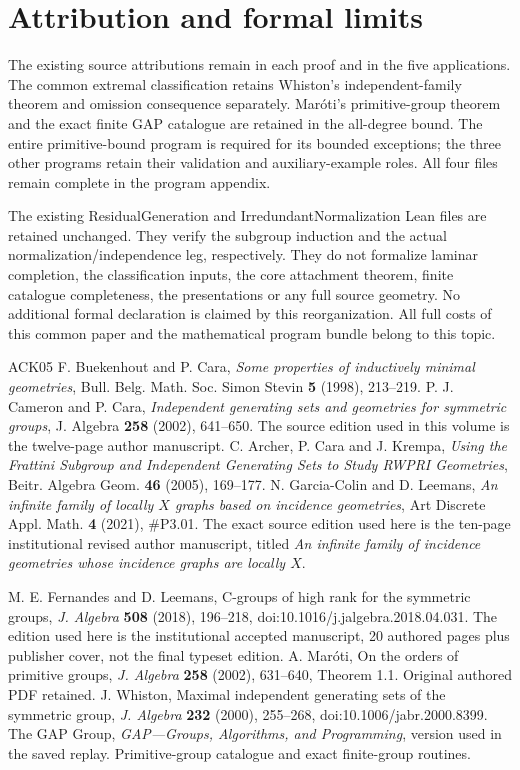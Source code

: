 \section{Attribution and formal limits}
The existing source attributions remain in each proof and in the five
applications. The common extremal classification retains Whiston's
independent-family theorem and omission consequence separately.
Mar\'oti's primitive-group theorem and the exact finite GAP catalogue
are retained in the all-degree bound. The entire primitive-bound
program is required for its bounded exceptions; the three other
programs retain their validation and auxiliary-example roles.
All four files remain complete in the program appendix.

The existing ResidualGeneration and IrredundantNormalization Lean
files are retained unchanged. They verify the subgroup induction and
the actual normalization/independence leg, respectively. They do not
formalize laminar completion, the classification inputs, the core
attachment theorem, finite catalogue completeness, the presentations
or any full source geometry. No additional formal declaration is
claimed by this reorganization. All full costs of this common paper
and the mathematical program bundle belong to this topic.

\begin{thebibliography}{ACK05}
 F. Buekenhout and P. Cara,
\emph{Some properties of inductively minimal geometries},
Bull. Belg. Math. Soc. Simon Stevin \textbf{5} (1998), 213--219.
 P. J. Cameron and P. Cara,
\emph{Independent generating sets and geometries for symmetric groups},
J. Algebra \textbf{258} (2002), 641--650. The source edition used in this
volume is the twelve-page author manuscript.
 C. Archer, P. Cara and J. Krempa,
\emph{Using the Frattini Subgroup and Independent Generating Sets to Study
RWPRI Geometries}, Beitr. Algebra Geom. \textbf{46} (2005), 169--177.
 N. Garcia-Colin and D. Leemans,
\emph{An infinite family of locally $X$ graphs based on incidence geometries},
Art Discrete Appl. Math. \textbf{4} (2021), \#P3.01. The exact source
edition used here is the ten-page institutional revised author manuscript,
titled \emph{An infinite family of incidence geometries whose incidence
graphs are locally $X$}.

 M. E. Fernandes and D. Leemans,
C-groups of high rank for the symmetric groups,
\emph{J. Algebra} \textbf{508} (2018), 196--218,
doi:10.1016/j.jalgebra.2018.04.031.
The edition used here is the institutional accepted manuscript,
20 authored pages plus publisher cover, not the final typeset edition.
 A. Mar\'oti,
On the orders of primitive groups,
\emph{J. Algebra} \textbf{258} (2002), 631--640, Theorem 1.1.
Original authored PDF retained.
 J. Whiston,
Maximal independent generating sets of the symmetric group,
\emph{J. Algebra} \textbf{232} (2000), 255--268,
doi:10.1006/jabr.2000.8399.
 The GAP Group,
\emph{GAP---Groups, Algorithms, and Programming}, version used in the
saved replay. Primitive-group catalogue and exact finite-group routines.
\end{thebibliography}

